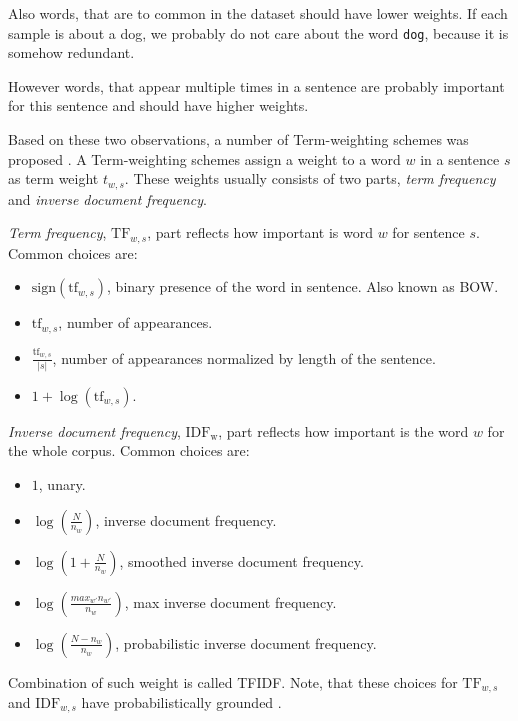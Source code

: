         Also words, that are to common in the dataset should have lower weights.
        If each sample is about a dog, we probably do not care about the word \texttt{dog}, because it is somehow redundant.
        
        However words, that appear multiple times in a sentence are probably important for this sentence and should have higher weights.
        
        Based on these two observations, a number of Term-weighting schemes was proposed \cite{salton1988term}.
        A Term-weighting schemes assign a weight to a word $w$ in a sentence $s$ as term weight $t_{w,s}$.
        These weights usually consists of two parts, \emph{term frequency} and \emph{inverse document frequency}. 
        
        \emph{Term frequency}, $\mathrm{TF}_{w,s}$, part reflects how important is word $w$ for sentence $s$.
        Common choices are:
        \begin{itemize}
            \item $\mathrm{sign}(\mathrm{tf}_{w,s})$, binary presence of the word in sentence. Also known as BOW.
            \item $\mathrm{tf}_{w,s}$, number of appearances.
            \item $\frac{\mathrm{tf}_{w,s}}{|s|}$, number of appearances normalized by length of the sentence.
            \item $1+\log(\mathrm{tf}_{w,s})$.
        \end{itemize}
        
        \emph{Inverse document frequency}, $\mathrm{IDF_w}$, part reflects how important is the word $w$ for the whole corpus.
        Common choices are:
        \begin{itemize}
            \item $1$, unary.
            \item $\log \left(\frac{N}{n_w} \right)$, inverse document frequency.
            \item $\log \left( 1+\frac{N}{n_w} \right)$, smoothed inverse document frequency.
            \item $\log \left( \frac{max_{w'} n_{w'}}{n_w} \right)$, max inverse document frequency.
            \item $\log \left(\frac{N-n_w}{n_w} \right)$, probabilistic inverse document frequency.
        \end{itemize}

        Combination of such weight is called TFIDF.
        Note, that these choices for $\mathrm{TF}_{w,s}$ and $\mathrm{IDF}_{w,s}$ have probabilistically grounded \cite{aizawa2003information}. %
        
